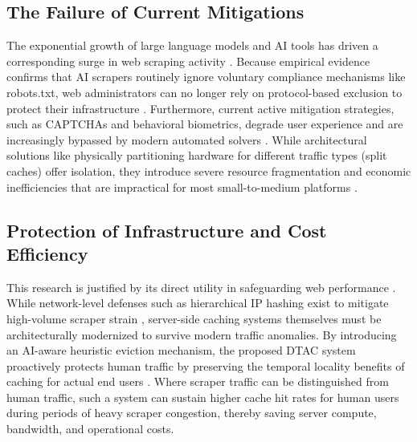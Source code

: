 \subsection{The Failure of Current Mitigations}
The exponential growth of large language models and AI tools has driven a corresponding surge in web scraping activity \cite{zhang_rethinking_2026}. Because empirical evidence confirms that AI scrapers routinely ignore voluntary compliance mechanisms like robots.txt, web administrators can no longer rely on protocol-based exclusion to protect their infrastructure \cite{kim_scrapers_2025}. Furthermore, current active mitigation strategies, such as CAPTCHAs and behavioral biometrics, degrade user experience and are increasingly bypassed by modern automated solvers \cite{ousat_broken_2026}. While architectural solutions like physically partitioning hardware for different traffic types (split caches) offer isolation, they introduce severe resource fragmentation and economic inefficiencies that are impractical for most small-to-medium platforms \cite{zhang_rethinking_2026}.

\subsection{Protection of Infrastructure and Cost Efficiency}
This research is justified by its direct utility in safeguarding web performance \cite{umar_experimental_2026}. While network-level defenses such as hierarchical IP hashing exist to mitigate high-volume scraper strain \cite{hoetzlein_protecting_2025}, server-side caching systems themselves must be architecturally modernized to survive modern traffic anomalies. By introducing an AI-aware heuristic eviction mechanism, the proposed DTAC system proactively protects human traffic by preserving the temporal locality benefits of caching for actual end users \cite{breslau_web_1999, zhang_rethinking_2026}. Where scraper traffic can be distinguished from human traffic, such a system can sustain higher cache hit rates for human users during periods of heavy scraper congestion, thereby saving server compute, bandwidth, and operational costs.